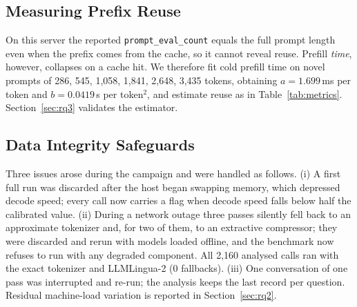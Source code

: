 \documentclass[journal]{IEEEtran}
\begin{document}
\subsection{Measuring Prefix Reuse}\label{sec:reuse}
On this server the reported \texttt{prompt\_eval\_count} equals the full prompt length even when the prefix comes from the cache,
so it cannot reveal reuse. Prefill \emph{time}, however, collapses on a cache hit. We therefore fit cold prefill time on novel
prompts of 286, 545, 1,058, 1,841, 2,648, 3,435 tokens, obtaining $a=1.699$\,ms per token and $b=0.0419$\,\textmu s per token$^2$, and estimate reuse as in
Table~\ref{tab:metrics}. Section~\ref{sec:rq3} validates the estimator.

\subsection{Data Integrity Safeguards}
Three issues arose during the campaign and were handled as follows. (i) A first full run was discarded after the host began swapping
memory, which depressed decode speed; every call now carries a flag when decode speed falls below half the calibrated value.
(ii) During a network outage three passes silently fell back to an approximate tokenizer and, for two of them, to an extractive
compressor; they were discarded and rerun with models loaded offline, and the benchmark now refuses to run with any degraded
component. All 2,160 analysed calls ran with the exact tokenizer and LLMLingua-2 (0 fallbacks). (iii) One
conversation of one pass was interrupted and re-run; the analysis keeps the last record per question. Residual machine-load
variation is reported in Section~\ref{sec:rq2}.

\end{document}
